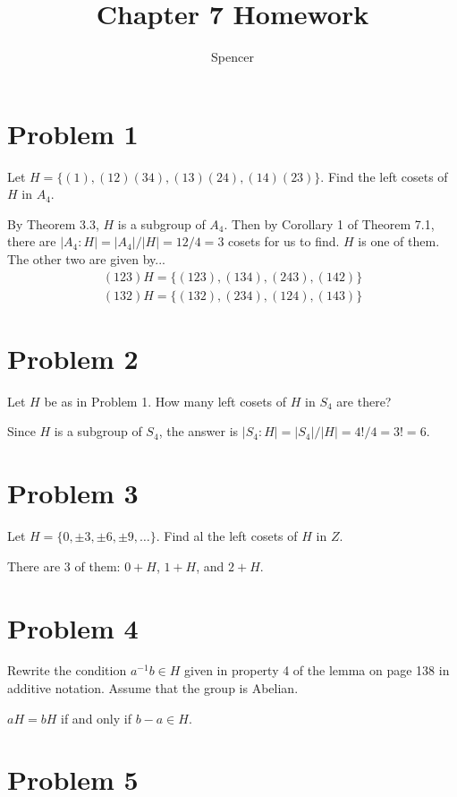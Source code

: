 \documentclass{article}
\title{Chapter 7 Homework}
\author{Spencer}
\begin{document}
\maketitle

\newcommand{\stab}{\mbox{stab}}
\newcommand{\orb}{\mbox{orb}}

\section*{Problem 1}

Let $H=\{(1),(12)(34),(13)(24),(14)(23)\}$.  Find the left cosets of $H$
in $A_4$.

By Theorem 3.3, $H$ is a subgroup of $A_4$.  Then by Corollary 1 of Theorem 7.1,
there are $|A_4:H|=|A_4|/|H|=12/4=3$ cosets for us to find.  $H$ is one of them.
The other two are given by...
\begin{align*}
(123)H=\{(123),(134),(243),(142)\} \\
(132)H=\{(132),(234),(124),(143)\}
\end{align*}

\section*{Problem 2}

Let $H$ be as in Problem 1.  How many left cosets of $H$ in $S_4$ are there?

Since $H$ is a subgroup of $S_4$, the answer is $|S_4:H|=|S_4|/|H|=4!/4=3!=6$.

\section*{Problem 3}

Let $H=\{0,\pm 3, \pm 6, \pm 9, \dots\}$.  Find al the left cosets of $H$ in $Z$.

There are 3 of them: $0+H$, $1+H$, and $2+H$.

\section*{Problem 4}

Rewrite the condition $a^{-1}b\in H$ given in property 4 of the lemma on
page 138 in additive notation.  Assume that the group is Abelian.

$aH=bH$ if and only if $b-a\in H$.

\section*{Problem 5}
\end{document}
